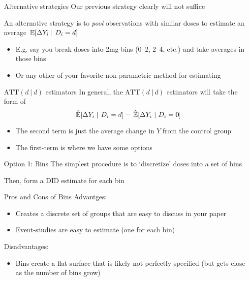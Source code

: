 \documentclass[aspectratio=43,t]{beamer}
\begin{document}

\begin{frame}{Alternative strategies}
  Our previous strategy clearly will not suffice

  \bigskip
  An alternative strategy is to \emph{pool} observations with similar doses to estimate an average $\expec{\Delta Y_i}{D_i = d}$
  \begin{itemize}
    \item E.g. say you break doses into 2mg bins (0--2, 2--4, etc.) and take averages in those bins

    \item Or any other of your favorite non-parametric method for estimating
  \end{itemize}
\end{frame}

\begin{frame}{$\text{ATT}(d \ | \ d)$ estimators}
  In general, the $\text{ATT}(d \ | \ d)$ estimators will take the form of
  $$
    \expechat{\Delta Y_i}{D_i = d} - \expechat{\Delta Y_i}{D_i = 0}
  $$

  \begin{itemize}
    \item The second term is just the average change in $Y$ from the control group

    \item The first-term is where we have some options
  \end{itemize}
\end{frame}

\begin{frame}{Option 1: Bins}
  The simplest procedure is to `discretize' doses into a set of bins

  \bigskip
  Then, form a DID estimate for each bin
\end{frame}


\begin{frame}{Pros and Cons of Bins}
  Advantges:
  \begin{itemize}
    \item Creates a discrete set of groups that are easy to discuss in your paper

    \item Event-studies are easy to estimate (one for each bin)
  \end{itemize}

  \bigskip
  Disadvantages:
  \begin{itemize}
    \item Bins create a flat surface that is likely not perfectly specified (but gets close as the number of bins grow)
  \end{itemize}
\end{frame}
\end{document}
